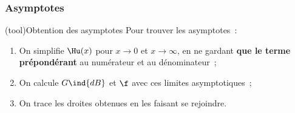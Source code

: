 \documentclass[../../main/main.tex]{subfiles}
\begin{document}
\subsubsection{Asymptotes}
\begin{tcb*}(tool){Obtention des asymptotes}
	Pour trouver les asymptotes~:
	\begin{enumerate}
		\item On simplifie $\Hu(x)$ pour $x\to 0$ et $x\to \infty$, en ne gardant
		      \textbf{que le terme prépondérant} au numérateur et au dénominateur~;
		\item On calcule $G\ind{dB}$ et $\f$ avec ces limites asymptotiques~;
		\item On trace les droites obtenues en les faisant se rejoindre.
	\end{enumerate}
\end{tcb*}
\end{document}
